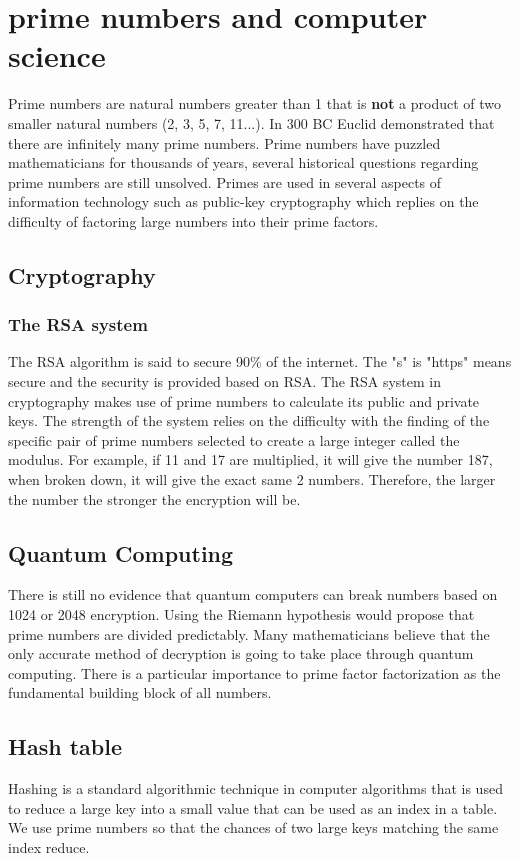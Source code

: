 \documentclass[12pt]{amsart} %
\theoremstyle{definition}
\theoremstyle{remark}
\numberwithin{equation}{section}
\begin{document}
\section{prime numbers and computer science}

Prime numbers are natural numbers greater than 1 that is \textbf{not} a product of two smaller natural numbers (2, 3, 5, 7, 11...). In 300 BC Euclid demonstrated that there are infinitely many prime numbers. Prime numbers have puzzled mathematicians for thousands of years, several historical questions regarding prime numbers are still unsolved. Primes are used in several aspects of information technology such as public-key cryptography which replies on the difficulty of factoring large numbers into their prime factors.
\subsection{Cryptography} 	
\subsubsection{The RSA system}
The RSA algorithm is said to secure 90\% of the internet. The "s" is "https" means secure and the security is provided based on RSA. The RSA system in cryptography makes use of prime numbers to calculate its public and private keys. The strength of the system relies on the difficulty with the finding of the specific pair of prime numbers selected to create a large integer called the modulus. For example, 
if 11 and 17 are multiplied, it will give the number 187, when broken down, it will give the exact same 2 numbers. Therefore, the larger the number the stronger the encryption will be.
\subsection{Quantum Computing}
There is still no evidence that quantum computers can break numbers based on 1024 or 2048 encryption. Using the Riemann hypothesis would propose that prime numbers are divided predictably. Many mathematicians believe that the only accurate method of decryption is going to take place through quantum computing. There is a particular importance to prime factor factorization as the fundamental building block of all numbers. 
\subsection{Hash table}
Hashing is a standard algorithmic technique in computer algorithms that is used to reduce a large key into a small value that can be used as an index in a table. We use prime numbers so that the chances of two large keys matching the same index reduce. 
\\
\end{document}
